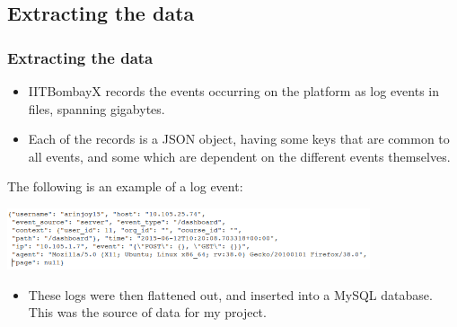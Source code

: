 \documentclass[12pt,xcolor=dvipsnames]{beamer}
\begin{document}
\subsection{Extracting the data}
\begin{frame}[t]
\frametitle{Extracting the data}

\begin{itemize}

\item IITBombayX records the events occurring on the platform as log events in files, spanning gigabytes.

\item Each of the records is a JSON object, having some keys that are common to all events, and some which are dependent on the different events themselves.

\end{itemize}

The following is an example of a log event:

\begin{center}
\includegraphics[height=1.8cm]{Diag1.png}\\ %
\end{center}

\begin{itemize}
\item These logs were then flattened out, and inserted into a MySQL database. This was the source of data for my project.
\end{itemize}

\end{frame}

\end{document}
